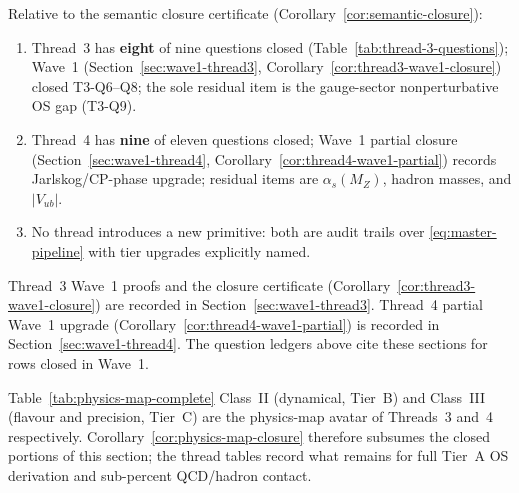 \begin{corollary}\label{cor:threads-3-4-audit}
Relative to the semantic closure certificate
(Corollary~\ref{cor:semantic-closure}):
\begin{enumerate}[label=(\roman*),leftmargin=*]
  \item Thread~3 has \textbf{eight} of nine questions closed
    (Table~\ref{tab:thread-3-questions}); Wave~1
    (Section~\ref{sec:wave1-thread3},
    Corollary~\ref{cor:thread3-wave1-closure}) closed T3-Q6--Q8; the sole
    residual item is the gauge-sector nonperturbative OS gap (T3-Q9).
  \item Thread~4 has \textbf{nine} of eleven questions closed;
    Wave~1 partial closure (Section~\ref{sec:wave1-thread4},
    Corollary~\ref{cor:thread4-wave1-partial}) records Jarlskog/CP-phase
    upgrade; residual items are $\alpha_s(M_Z)$, hadron masses, and
    $|V_{ub}|$.
  \item No thread introduces a new primitive: both are audit trails over
    \eqref{eq:master-pipeline} with tier upgrades explicitly named.
\end{enumerate}
\end{corollary}

\begin{remark}
Thread~3 Wave~1 proofs and the closure certificate
(Corollary~\ref{cor:thread3-wave1-closure}) are recorded in
Section~\ref{sec:wave1-thread3}. Thread~4 partial Wave~1 upgrade
(Corollary~\ref{cor:thread4-wave1-partial}) is recorded in
Section~\ref{sec:wave1-thread4}. The question ledgers above cite these
sections for rows closed in Wave~1.
\end{remark}

\begin{remark}
Table~\ref{tab:physics-map-complete} Class~II (dynamical, Tier~B) and
Class~III (flavour and precision, Tier~C) are the physics-map avatar of
Threads~3 and~4 respectively. Corollary~\ref{cor:physics-map-closure}
therefore subsumes the closed portions of this section; the thread tables
record what remains for full Tier~A OS derivation and sub-percent QCD/hadron
contact.
\end{remark}